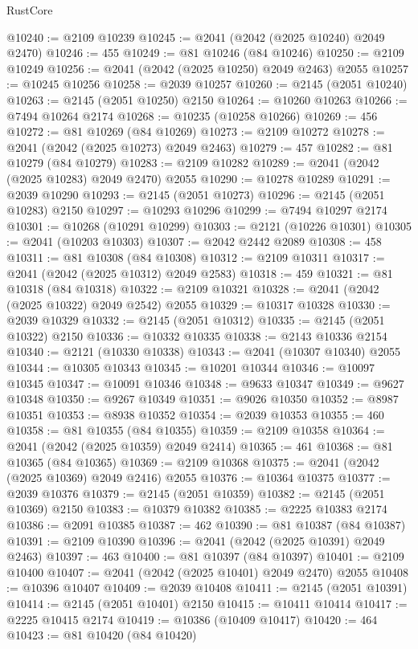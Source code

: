 \begin{lexlean}{RustCore}
\begin{coremodule}
@10240 := @2109 @10239
@10245 := @2041 (@2042 (@2025 @10240) @2049 @2470)
@10246 := 455
@10249 := @81 @10246 (@84 @10246)
@10250 := @2109 @10249
@10256 := @2041 (@2042 (@2025 @10250) @2049 @2463) @2055
@10257 := @10245 @10256
@10258 := @2039 @10257
@10260 := @2145 (@2051 @10240)
@10263 := @2145 (@2051 @10250) @2150
@10264 := @10260 @10263
@10266 := @7494 @10264 @2174
@10268 := @10235 (@10258 @10266)
@10269 := 456
@10272 := @81 @10269 (@84 @10269)
@10273 := @2109 @10272
@10278 := @2041 (@2042 (@2025 @10273) @2049 @2463)
@10279 := 457
@10282 := @81 @10279 (@84 @10279)
@10283 := @2109 @10282
@10289 := @2041 (@2042 (@2025 @10283) @2049 @2470) @2055
@10290 := @10278 @10289
@10291 := @2039 @10290
@10293 := @2145 (@2051 @10273)
@10296 := @2145 (@2051 @10283) @2150
@10297 := @10293 @10296
@10299 := @7494 @10297 @2174
@10301 := @10268 (@10291 @10299)
@10303 := @2121 (@10226 @10301)
@10305 := @2041 (@10203 @10303)
@10307 := @2042 @2442 @2089
@10308 := 458
@10311 := @81 @10308 (@84 @10308)
@10312 := @2109 @10311
@10317 := @2041 (@2042 (@2025 @10312) @2049 @2583)
@10318 := 459
@10321 := @81 @10318 (@84 @10318)
@10322 := @2109 @10321
@10328 := @2041 (@2042 (@2025 @10322) @2049 @2542) @2055
@10329 := @10317 @10328
@10330 := @2039 @10329
@10332 := @2145 (@2051 @10312)
@10335 := @2145 (@2051 @10322) @2150
@10336 := @10332 @10335
@10338 := @2143 @10336 @2154
@10340 := @2121 (@10330 @10338)
@10343 := @2041 (@10307 @10340) @2055
@10344 := @10305 @10343
@10345 := @10201 @10344
@10346 := @10097 @10345
@10347 := @10091 @10346
@10348 := @9633 @10347
@10349 := @9627 @10348
@10350 := @9267 @10349
@10351 := @9026 @10350
@10352 := @8987 @10351
@10353 := @8938 @10352
@10354 := @2039 @10353
@10355 := 460
@10358 := @81 @10355 (@84 @10355)
@10359 := @2109 @10358
@10364 := @2041 (@2042 (@2025 @10359) @2049 @2414)
@10365 := 461
@10368 := @81 @10365 (@84 @10365)
@10369 := @2109 @10368
@10375 := @2041 (@2042 (@2025 @10369) @2049 @2416) @2055
@10376 := @10364 @10375
@10377 := @2039 @10376
@10379 := @2145 (@2051 @10359)
@10382 := @2145 (@2051 @10369) @2150
@10383 := @10379 @10382
@10385 := @2225 @10383 @2174
@10386 := @2091 @10385
@10387 := 462
@10390 := @81 @10387 (@84 @10387)
@10391 := @2109 @10390
@10396 := @2041 (@2042 (@2025 @10391) @2049 @2463)
@10397 := 463
@10400 := @81 @10397 (@84 @10397)
@10401 := @2109 @10400
@10407 := @2041 (@2042 (@2025 @10401) @2049 @2470) @2055
@10408 := @10396 @10407
@10409 := @2039 @10408
@10411 := @2145 (@2051 @10391)
@10414 := @2145 (@2051 @10401) @2150
@10415 := @10411 @10414
@10417 := @2225 @10415 @2174
@10419 := @10386 (@10409 @10417)
@10420 := 464
@10423 := @81 @10420 (@84 @10420)

\end{coremodule}
\end{lexlean}
